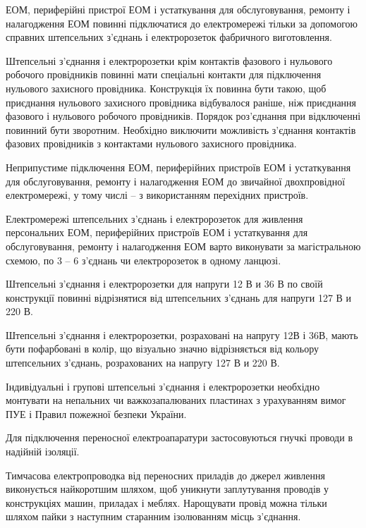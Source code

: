 \documentclass[simple,a4paper,14pt,ukrainian,utf8]{eskdtext}
\begin{document}
\begin{appendices}
                ЕОМ, периферійні пристрої ЕОМ і устаткування для обслуговування, ремонту і налагодження ЕОМ повинні підключатися до електромережі тільки за допомогою справних штепсельних з'єднань і електророзеток фабричного виготовлення.

                Штепсельні з'єднання і електророзетки крім контактів фазового і нульового робочого провідників повинні мати спеціальні контакти для підключення нульового захисного провідника. Конструкція їх повинна бути такою, щоб приєднання нульового захисного провідника відбувалося раніше, ніж приєднання фазового і нульового робочого провідників. Порядок роз'єднання при відключенні повинний бути зворотним. Необхідно виключити можливість з'єднання контактів фазових провідників з контактами нульового захисного провідника.

                Неприпустиме підключення ЕОМ, периферійних пристроїв ЕОМ і устаткування для обслуговування, ремонту і налагодження ЕОМ до звичайної двохпровідної електромережі, у тому числі -- з використанням перехідних пристроїв.

                Електромережі штепсельних з'єднань і електророзеток для живлення персональних ЕОМ, периферійних пристроїв ЕОМ і устаткування для обслуговування, ремонту і налагодження ЕОМ варто виконувати за магістральною схемою, по 3 -- 6 з'єднань чи електророзеток в одному ланцюзі.

                Штепсельні з'єднання і електророзетки для напруги 12 В и 36 В по своїй конструкції повинні відрізнятися від штепсельних з'єднань для напруги 127 В и 220 В.

                Штепсельні з'єднання і електророзетки, розраховані на напругу 12В і 36В, мають бути пофарбовані в колір, що візуально значно відрізняється від кольору штепсельних з'єднань, розрахованих на напругу 127 В и 220 В.

                Індивідуальні і групові штепсельні з'єднання і електророзетки необхідно монтувати на непальних чи важкозапалюваних пластинах з урахуванням вимог ПУЕ і Правил пожежної безпеки України.

                Для підключення переносної електроапаратури застосовуються гнучкі проводи в надійній ізоляції.

                Тимчасова електропроводка від переносних приладів до джерел живлення виконується  найкоротшим шляхом, щоб уникнути заплутування проводів у конструкціях машин, приладах і меблях. Нарощувати провід можна тільки шляхом пайки з наступним старанним ізолюванням місць з'єднання.


\end{appendices}
\end{document}
